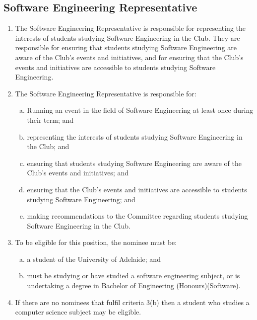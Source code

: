 \documentclass{schedule}
\begin{document}
\subsection{Software Engineering Representative}
\begin{enumerate}[(1)]
    \item The Software Engineering Representative is responsible for representing the interests of students studying Software Engineering in the Club. They are responsible for ensuring that students studying Software Engineering are aware of the Club's events and initiatives, and for ensuring that the Club's events and initiatives are accessible to students studying Software Engineering.
    \item The Software Engineering Representative is responsible for:
          \begin{enumerate}[(a)]
              \item Running an event in the field of Software Engineering at least once during their term; and
              \item representing the interests of students studying Software Engineering in the Club; and
              \item ensuring that students studying Software Engineering are aware of the Club's events and initiatives; and
              \item ensuring that the Club's events and initiatives are accessible to students studying Software Engineering; and
              \item making recommendations to the Committee regarding students studying Software Engineering in the Club.
          \end{enumerate}
    \item To be eligible for this position, the nominee must be:
          \begin{enumerate}[(a)]
              \item a student of the University of Adelaide; and
              \item must be studying or have studied a software engineering subject, or is undertaking a degree in Bachelor of Engineering (Honours)(Software).
          \end{enumerate}
    \item If there are no nominees that fulfil criteria 3(b) then a student who studies a computer science subject may be eligible.
\end{enumerate}
\end{document}

